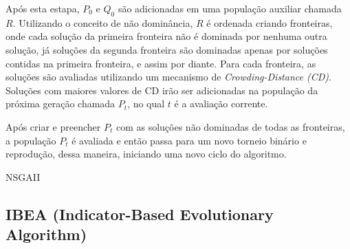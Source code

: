 Após esta estapa, $P_0$ e $Q_0$ são adicionadas em uma população auxiliar chamada $R$. Utilizando o conceito de não dominância, $R$ é ordenada 
criando fronteiras, onde cada solução da primeira fronteira não é dominada por nenhuma outra solução, já soluções da segunda fronteira são dominadas
apenas por soluções contidas na primeira fronteira, e assim por diante. Para cada fronteira, as soluções são avaliadas utilizando um mecanismo
de \textit{Crowding-Distance (CD)}. Soluções com maiores valores de CD irão ser adicionadas na população da próxima geração chamada $P_t$, no qual $t$ é a
avaliação corrente.

Após criar e preencher $P_t$ com as soluções não dominadas de todas as fronteiras, a população $P_t$ é avaliada e então passa para um novo
torneio binário e reprodução, dessa maneira, iniciando uma novo ciclo do algoritmo.

\begin{algorithm}[htb!]
	\begin{algorithmic}[1]
		\EndWhile
		\EndWhile
		
		\EndWhile
	\end{algorithmic}
	\caption{NSGAII}
	\label{alg:nsgaII}
\end{algorithm}



\subsection{IBEA (Indicator-Based Evolutionary Algorithm)}

